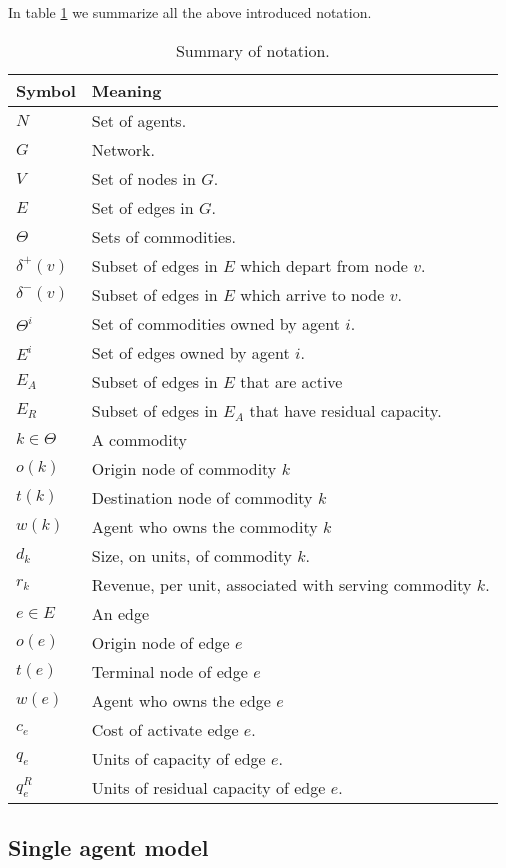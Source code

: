 \documentclass{article}
\begin{document}
In table \ref{tb:notation} we summarize all the above introduced notation.

\begin{table}[ht!]
	\caption{Summary of notation. \label{tb:notation}}
	\begin{tabular}{|l|l|}
	\hline
	Symbol & Meaning	 \\ \hline
	$N$ & Set of agents. \\
	$G$ & Network. \\
	$V$ & Set of nodes in $G$. \\
	$E$ & Set of edges in $G$. \\
	$\Theta$ & Sets of commodities. \\
	$\delta^+(v)$ & Subset of edges in $E$ which depart from node $v$.\\
	$\delta^-(v)$ & Subset of edges in $E$ which arrive to node $v$.\\	
	$\Theta^i$ & Set of commodities owned by agent $i$. \\	
	$E^i$ & Set of edges owned by agent $i$.\\
	$E_A$ & Subset of edges in $E$ that are active \\
	$E_R$ & Subset of edges in $E_A$ that have residual capacity.\\
	$k \in \Theta$ & A commodity\\
	$o(k)$ & Origin node of commodity $k$\\
	$t(k)$ & Destination node of commodity $k$\\
	$w(k)$ & Agent who owns the commodity $k$\\
	$d_k$ & Size, on units, of commodity $k$.\\
	$r_k$ & Revenue, per unit, associated with serving commodity $k$.\\
	$e\in E$ & An edge\\
	$o(e)$ & Origin node of edge $e$\\
	$t(e)$ & Terminal node of edge $e$\\
	$w(e)$ & Agent who owns the edge $e$\\
	$c_e$ & Cost of activate edge $e$. \\
	$q_e$ & Units of capacity of edge $e$. \\
	$q_e^R$ & Units of residual capacity of edge $e$.\\
	\hline
	\end{tabular}
\end{table}

\subsection{Single agent model}
\end{document}
